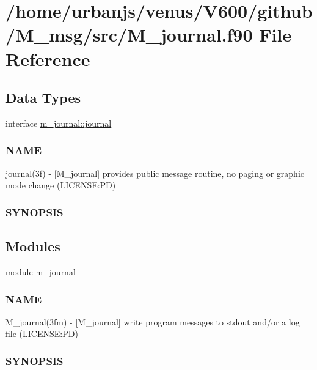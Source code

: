 \hypertarget{M__journal_8f90}{}\section{/home/urbanjs/venus/\+V600/github/\+M\+\_\+msg/src/\+M\+\_\+journal.f90 File Reference}
\label{M__journal_8f90}
\subsection*{Data Types}
\begin{DoxyCompactItemize}
\item 
interface \mbox{\hyperlink{interfacem__journal_1_1journal}{m\+\_\+journal\+::journal}}
\begin{DoxyCompactList}\small\item\em \subsubsection*{N\+A\+ME}

journal(3f) -\/ \mbox{[}M\+\_\+journal\mbox{]} provides public message routine, no paging or graphic mode change (L\+I\+C\+E\+N\+SE\+:PD) \subsubsection*{S\+Y\+N\+O\+P\+S\+IS}\end{DoxyCompactList}\end{DoxyCompactItemize}
\subsection*{Modules}
\begin{DoxyCompactItemize}
\item 
module \mbox{\hyperlink{namespacem__journal}{m\+\_\+journal}}
\begin{DoxyCompactList}\small\item\em \subsubsection*{N\+A\+ME}

M\+\_\+journal(3fm) -\/ \mbox{[}M\+\_\+journal\mbox{]} write program messages to stdout and/or a log file (L\+I\+C\+E\+N\+SE\+:PD) \subsubsection*{S\+Y\+N\+O\+P\+S\+IS}\end{DoxyCompactList}\end{DoxyCompactItemize}
